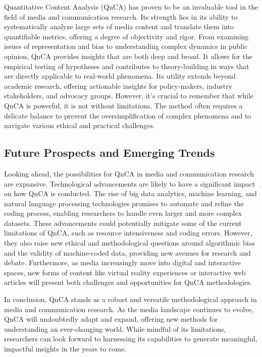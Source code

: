 \documentclass[
  b5paper]{book}
\begin{document}
Quantitative Content Analysis (QnCA) has proven to be an invaluable tool in the field of media and communication research. Its strength lies in its ability to systematically analyze large sets of media content and translate them into quantifiable metrics, offering a degree of objectivity and rigor. From examining issues of representation and bias to understanding complex dynamics in public opinion, QnCA provides insights that are both deep and broad. It allows for the empirical testing of hypotheses and contributes to theory-building in ways that are directly applicable to real-world phenomena. Its utility extends beyond academic research, offering actionable insights for policy-makers, industry stakeholders, and advocacy groups. However, it's crucial to remember that while QnCA is powerful, it is not without limitations. The method often requires a delicate balance to prevent the oversimplification of complex phenomena and to navigate various ethical and practical challenges.

\hypertarget{future-prospects-and-emerging-trends}{%
\subsection*{Future Prospects and Emerging Trends}\label{future-prospects-and-emerging-trends}}

Looking ahead, the possibilities for QnCA in media and communication research are expansive. Technological advancements are likely to have a significant impact on how QnCA is conducted. The rise of big data analytics, machine learning, and natural language processing technologies promises to automate and refine the coding process, enabling researchers to handle even larger and more complex datasets. These advancements could potentially mitigate some of the current limitations of QnCA, such as resource intensiveness and coding errors. However, they also raise new ethical and methodological questions around algorithmic bias and the validity of machine-coded data, providing new avenues for research and debate. Furthermore, as media increasingly move into digital and interactive spaces, new forms of content like virtual reality experiences or interactive web articles will present both challenges and opportunities for QnCA methodologies.

In conclusion, QnCA stands as a robust and versatile methodological approach in media and communication research. As the media landscape continues to evolve, QnCA will undoubtedly adapt and expand, offering new methods for understanding an ever-changing world. While mindful of its limitations, researchers can look forward to harnessing its capabilities to generate meaningful, impactful insights in the years to come.
\end{document}
